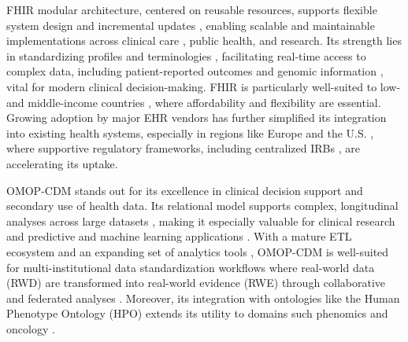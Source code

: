 FHIR modular architecture, centered on reusable resources, supports flexible system design and incremental updates \cite{park_worker-centered_2021}, enabling scalable and maintainable implementations across clinical care \cite{guinez-molinos_interoperable_2021,gulden_prototypical_2021}, public health, and research. Its strength lies in standardizing profiles and terminologies \cite{bennett2023mimic,rinaldi_towards_2023}, facilitating real-time access to complex data, including patient-reported outcomes \cite{wesley_novel_2021} and genomic information \cite{dolin_sync_2023,khalifa_interoperable_2021,seong_fast_2021,stellmach_creation_2023,dolin_vcf2fhir_2021_p1}, vital for modern clinical decision-making. FHIR is particularly well-suited to low- and middle-income countries \cite{chukwu_standardizing_2022}, where affordability and flexibility are essential. Growing adoption by major EHR vendors \cite{thayer_human-centered_2021} has further simplified its integration into existing health systems, especially in regions like Europe and the U.S. \cite{xiao_development_2021,jones_real_2024}, where supportive regulatory frameworks, including centralized IRBs \cite{eisenstein_economic_2022}, are accelerating its uptake.

OMOP-CDM stands out for its excellence in clinical decision support and secondary use of health data. Its relational model supports complex, longitudinal analyses across large datasets \cite{bhattacharjee_inspire_2024,ward_omop_2024}, making it especially valuable for clinical research and predictive and machine learning applications \cite{guo_development_2023,kim_transforming_2021,bathelt_opportunities_2022,nestsiarovich_predictors_2021}. With a mature ETL ecosystem \cite{almeida_bicenter-ad_2022} and an expanding set of analytics tools \cite{raventos_transforming_2023}, OMOP-CDM is well-suited for multi-institutional data standardization workflows where real-world data (RWD) are transformed into real-world evidence (RWE) through collaborative \cite{tan_applying_2022,mun_real-world_2021,almeida_bicenter-ad_2022} and federated analyses \cite{yu_integrating_2023,carus_mapping_2023}. Moreover, its integration with ontologies like the Human Phenotype Ontology (HPO) \cite{castano_identification_2022} extends its utility to domains such phenomics \cite{castano_identification_2022,papez_transforming_2023,khalid_standardized_2021} and oncology \cite{kempf_how_2023,park_cancer_2023,seol_effect_2023,yoo_transforming_2022,carus_mapping_2022}.

